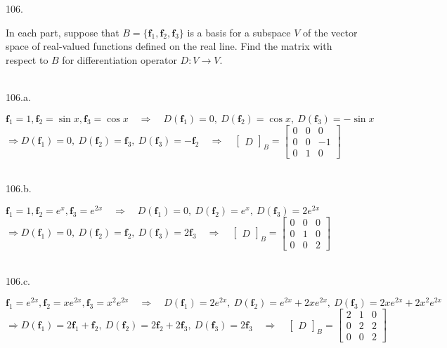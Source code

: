 \documentclass[12pt]{book}
\begin{document}
\begin{CJK}{UTF8}{bsmi}
106. \begin{minipage}[t]{\dimexpr\linewidth-2em}
In each part, suppose that $B=\{\textbf{f}_1, \textbf{f}_2, \textbf{f}_3\}$ is a basis for a subspace $V$ of the vector space of real-valued functions defined on the real line. Find the matrix with respect to $B$ for differentiation operator $D:V\rightarrow V$.
\end{minipage}\\

106.a. \begin{minipage}[t]{\dimexpr\linewidth-2em}
$\textbf{f}_1=1, \textbf{f}_2=\sin x, \textbf{f}_3=\cos x\quad\Rightarrow\quad D(\textbf{f}_1)=0,\ D(\textbf{f}_2)=\cos x,\ D(\textbf{f}_3)=-\sin x$ \\
$\Rightarrow D(\textbf{f}_1)=0,\ D(\textbf{f}_2)=\textbf{f}_3,\ D(\textbf{f}_3)=-\textbf{f}_2\quad\Rightarrow\quad\begin{bmatrix}
D
\end{bmatrix}_B=\begin{bmatrix}
0&0&0\\0&0&-1\\0&1&0
\end{bmatrix}$
\end{minipage}\\

106.b. \begin{minipage}[t]{\dimexpr\linewidth-2em}
$\textbf{f}_1=1, \textbf{f}_2=e^x, \textbf{f}_3=e^{2x}\quad\Rightarrow\quad D(\textbf{f}_1)=0,\ D(\textbf{f}_2)=e^x,\ D(\textbf{f}_3)=2e^{2x}$ \\
$\Rightarrow D(\textbf{f}_1)=0,\ D(\textbf{f}_2)=\textbf{f}_2,\ D(\textbf{f}_3)=2\textbf{f}_3\quad\Rightarrow\quad\begin{bmatrix}
D
\end{bmatrix}_B=\begin{bmatrix}
0&0&0\\0&1&0\\0&0&2
\end{bmatrix}$
\end{minipage}\\

106.c. \begin{minipage}[t]{\dimexpr\linewidth-2em}
$\textbf{f}_1=e^{2x}, \textbf{f}_2=xe^{2x}, \textbf{f}_3=x^2e^{2x}\quad\Rightarrow\quad D(\textbf{f}_1)=2e^{2x},\ D(\textbf{f}_2)=e^{2x}+2xe^{2x},\ D(\textbf{f}_3)=2xe^{2x}+2x^2e^{2x}$ \\
$\Rightarrow D(\textbf{f}_1)=2\textbf{f}_1+\textbf{f}_2,\ D(\textbf{f}_2)=2\textbf{f}_2+2\textbf{f}_3,\ D(\textbf{f}_3)=2\textbf{f}_3\quad\Rightarrow\quad\begin{bmatrix}
D
\end{bmatrix}_B=\begin{bmatrix}
2&1&0\\0&2&2\\0&0&2
\end{bmatrix}$
\end{minipage}\\


\end{CJK}
\end{document}
